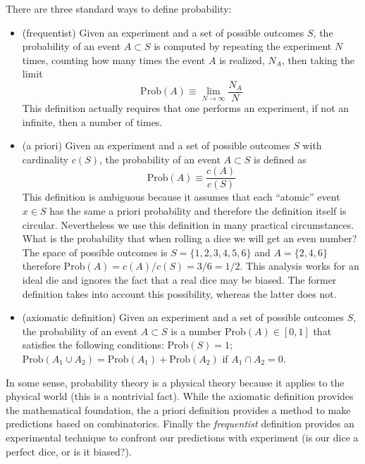 \documentclass[justified, sixbynine]{tufte-book}
\theoremstyle{plain}%
\newtheorem * {corollary}{Corollary}
\theoremstyle{definition}
\theoremstyle{remark}
\newtheorem * {remark}{Remark}
\newtheorem * {note}{Note}
\begin{document}
\begin{fullwidth}
There are three standard ways to define probability:

\begin{itemize}
\item  (frequentist) Given an experiment and a set of possible outcomes $S$, 
the probability of an event $A\subset S$ is computed by repeating the
experiment $N$ times, counting how many times the event $A$ is realized, $N_A
$, then taking the limit
\begin{equation}
\textrm{Prob}(A)\equiv \lim_{N\rightarrow \infty }\frac{N_A}N
\end{equation}
This definition actually requires that one performs an experiment, 
if not an infinite, then a number of times.

\item  (a priori) Given an experiment and a set of possible outcomes $S$
with cardinality $c(S)$, the probability of an event $A\subset S$ is defined
as
\begin{equation}
\textrm{Prob}(A)\equiv \frac{c(A)}{c(S)}
\end{equation}
This definition is ambiguous because it assumes that each ``atomic'' event $%
x\in S$ has the same a priori probability and therefore the definition
itself is circular. Nevertheless we use this definition in many practical
circumstances. What is the probability that when rolling a dice we will get an even
number? The space of possible outcomes is $S=\{1, 2, 3, 4, 5, 6\}$ and $A=\{2, 4, 6\}
$ therefore $\textrm{Prob}(A)=c(A)/c(S)=3/6=1/2$. This analysis works for an ideal die
and ignores the fact that a real dice may be biased. The former definition
takes into account this possibility, whereas the latter does not.

\item  (axiomatic definition) Given an experiment and a set of possible
outcomes $S$, the probability of an event $A\subset S$ is a number $\textrm{Prob}(A)\in
[0, 1]$ that satisfies the following conditions: $\textrm{Prob}(S)=1$; $\textrm{Prob}(A_1\cup
A_2)=\textrm{Prob}(A_1)+\textrm{Prob}(A_2)$ if $A_1\cap A_2=0$.
\end{itemize}

In some sense, probability theory is a physical theory because it applies to
the physical world (this is a nontrivial fact). While the axiomatic
definition provides the mathematical foundation, the a priori
definition provides a method to make predictions based on combinatorics.
Finally the {\em frequentist} definition provides an experimental
technique to confront our predictions with experiment (is our dice a perfect
dice, or is it biased?).


\end{fullwidth}
\end{document}
